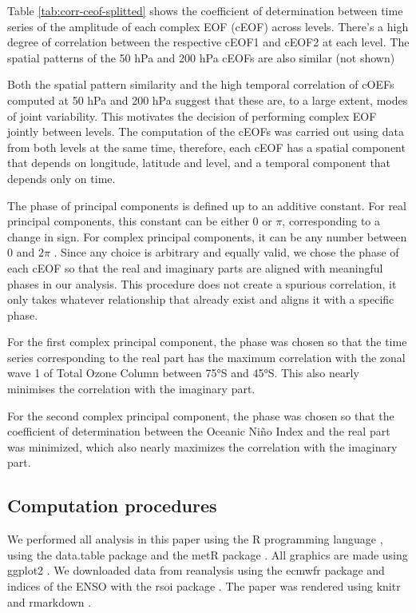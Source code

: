 \documentclass[smallextended]{svjour3}       %
\begin{document}
Table \ref{tab:corr-ceof-splitted} shows the coefficient of determination between time series of the amplitude of each complex EOF (cEOF) across levels. There's a high degree of correlation between the respective cEOF1 and cEOF2 at each level. The spatial patterns of the 50 hPa and 200 hPa cEOFs are also similar (not shown)

Both the spatial pattern similarity and the high temporal correlation of cOEFs computed at 50 hPa and 200 hPa suggest that these are, to a large extent, modes of joint variability. This motivates the decision of performing complex EOF jointly between levels. The computation of the cEOFs was carried out using data from both levels at the same time, therefore, each cEOF has a spatial component that depends on longitude, latitude and level, and a temporal component that depends only on time.

The phase of principal components is defined up to an additive constant. For real principal components, this constant can be either 0 or \(\pi\), corresponding to a change in sign. For complex principal components, it can be any number between 0 and \(2\pi\) \citep{horel1984}. Since any choice is arbitrary and equally valid, we chose the phase of each cEOF so that the real and imaginary parts are aligned with meaningful phases in our analysis. This procedure does not create a spurious correlation, it only takes whatever relationship that already exist and aligns it with a specific phase.



For the first complex principal component, the phase was chosen so that the time series corresponding to the real part has the maximum correlation with the zonal wave 1 of Total Ozone Column between 75°S and 45°S. This also nearly minimises the correlation with the imaginary part.

For the second complex principal component, the phase was chosen so that the coefficient of determination between the Oceanic Niño Index \citep{bamston1997} and the real part was minimized, which also nearly maximizes the correlation with the imaginary part.

\hypertarget{computation-procedures}{%
\subsection{Computation procedures}\label{computation-procedures}}

We performed all analysis in this paper using the R programming language \citep{rcoreteam2020}, using the data.table package \citep{dowle2020} and the metR package \citep{campitelli2020}. All graphics are made using ggplot2 \citep{wickham2009}. We downloaded data from reanalysis using the ecmwfr package \citep{hufkens2020} and indices of the ENSO with the rsoi package \citep{albers2020}. The paper was rendered using knitr and rmarkdown \citep{xie2015, allaire2019}.
\end{document}
